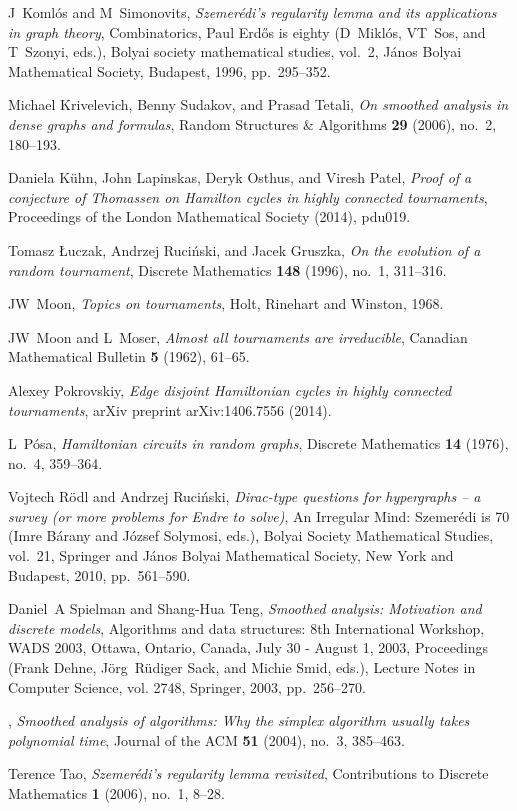 \documentclass[11pt,english]{article}
\theoremstyle{plain}
\theoremstyle{definition}
\theoremstyle{definition}
\theoremstyle{plain}
\theoremstyle{plain}
\theoremstyle{plain}
\theoremstyle{plain}
\theoremstyle{remark}
\theoremstyle{remark}
\begin{document}
\begin{thebibliography}{10}
J~Koml\'os and M~Simonovits, \emph{Szemer\'edi's regularity lemma and its
  applications in graph theory}, Combinatorics, {P}aul {E}rd\H{o}s is eighty
  (D~Mikl\'os, VT~Sos, and T~Szonyi, eds.), Bolyai society mathematical
  studies, vol.~2, J\'anos {B}olyai Mathematical Society, Budapest, 1996,
  pp.~295--352.

Michael Krivelevich, Benny Sudakov, and Prasad Tetali, \emph{On smoothed
  analysis in dense graphs and formulas}, Random Structures \& Algorithms
  \textbf{29} (2006), no.~2, 180--193.

Daniela K{\"u}hn, John Lapinskas, Deryk Osthus, and Viresh Patel, \emph{Proof
  of a conjecture of {T}homassen on {H}amilton cycles in highly connected
  tournaments}, Proceedings of the London Mathematical Society (2014), pdu019.

Tomasz {\L}uczak, Andrzej Ruci{\'n}ski, and Jacek Gruszka, \emph{On the
  evolution of a random tournament}, Discrete Mathematics \textbf{148} (1996),
  no.~1, 311--316.

JW~Moon, \emph{Topics on tournaments}, Holt, Rinehart and Winston, 1968.

JW~Moon and L~Moser, \emph{Almost all tournaments are irreducible}, Canadian
  Mathematical Bulletin \textbf{5} (1962), 61--65.

Alexey Pokrovskiy, \emph{Edge disjoint {H}amiltonian cycles in highly connected
  tournaments}, arXiv preprint arXiv:1406.7556 (2014).

L~P{\'o}sa, \emph{{H}amiltonian circuits in random graphs}, Discrete
  Mathematics \textbf{14} (1976), no.~4, 359--364.

Vojtech R{\"o}dl and Andrzej Ruci{\'n}ski, \emph{Dirac-type questions for
  hypergraphs -- a survey (or more problems for {E}ndre to solve)}, An
  Irregular Mind: Szemer\'edi is 70 (Imre B\'arany and J\'ozsef Solymosi,
  eds.), Bolyai Society Mathematical Studies, vol.~21, Springer and J\'anos
  Bolyai Mathematical Society, New York and Budapest, 2010, pp.~561--590.

Daniel~A Spielman and Shang-Hua Teng, \emph{Smoothed analysis: Motivation and
  discrete models}, Algorithms and data structures: 8th International Workshop,
  WADS 2003, Ottawa, Ontario, Canada, July 30 - August 1, 2003, Proceedings
  (Frank Dehne, J{\"o}rg~R{\"u}diger Sack, and Michie Smid, eds.), Lecture
  Notes in Computer Science, vol. 2748, Springer, 2003, pp.~256--270.

\bysame, \emph{Smoothed analysis of algorithms: Why the simplex algorithm
  usually takes polynomial time}, Journal of the ACM \textbf{51} (2004), no.~3,
  385--463.

Terence Tao, \emph{Szemer\'edi's regularity lemma revisited}, Contributions to
  Discrete Mathematics \textbf{1} (2006), no.~1, 8--28.

\end{thebibliography}
\end{document}
